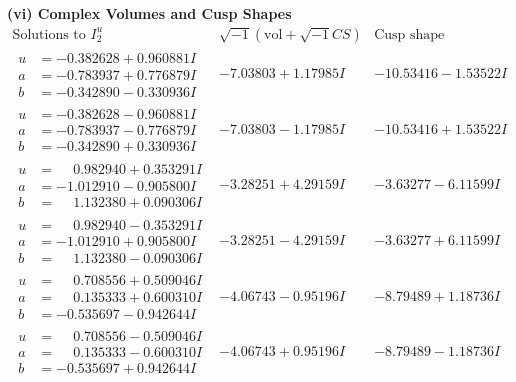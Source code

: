 \documentclass[1p]{elsarticle_modified}
\theoremstyle{definition}
\newcommand{\I}{\sqrt{-1}}
\begin{document}
\newpage\flushleft \textbf{(vi) Complex Volumes and Cusp Shapes}
$$\begin{array}{c|c|c}  
\text{Solutions to }I^u_{2}& \I (\text{vol} + \sqrt{-1}CS) & \text{Cusp shape}\\
 \hline 
\begin{aligned}
u &= -0.382628 + 0.960881 I \\
a &= -0.783937 + 0.776879 I \\
b &= -0.342890 - 0.330936 I\end{aligned}
 & -7.03803 + 1.17985 I & -10.53416 - 1.53522 I \\ \hline\begin{aligned}
u &= -0.382628 - 0.960881 I \\
a &= -0.783937 - 0.776879 I \\
b &= -0.342890 + 0.330936 I\end{aligned}
 & -7.03803 - 1.17985 I & -10.53416 + 1.53522 I \\ \hline\begin{aligned}
u &= \phantom{-}0.982940 + 0.353291 I \\
a &= -1.012910 - 0.905800 I \\
b &= \phantom{-}1.132380 + 0.090306 I\end{aligned}
 & -3.28251 + 4.29159 I & -3.63277 - 6.11599 I \\ \hline\begin{aligned}
u &= \phantom{-}0.982940 - 0.353291 I \\
a &= -1.012910 + 0.905800 I \\
b &= \phantom{-}1.132380 - 0.090306 I\end{aligned}
 & -3.28251 - 4.29159 I & -3.63277 + 6.11599 I \\ \hline\begin{aligned}
u &= \phantom{-}0.708556 + 0.509046 I \\
a &= \phantom{-}0.135333 + 0.600310 I \\
b &= -0.535697 - 0.942644 I\end{aligned}
 & -4.06743 - 0.95196 I & -8.79489 + 1.18736 I \\ \hline\begin{aligned}
u &= \phantom{-}0.708556 - 0.509046 I \\
a &= \phantom{-}0.135333 - 0.600310 I \\
b &= -0.535697 + 0.942644 I\end{aligned}
 & -4.06743 + 0.95196 I & -8.79489 - 1.18736 I \\ \hline\begin{aligned}

\end{aligned}
\end{array}$$
\end{document}
